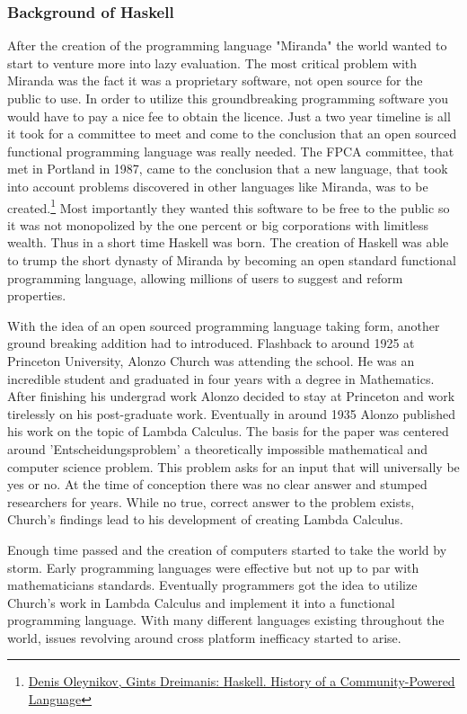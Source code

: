 \documentclass{article}
\begin{document}
        \subsubsection{Background of Haskell}
        After the creation of the programming language "Miranda" the world wanted to start to venture more into lazy evaluation. The most critical problem with Miranda was the fact it was a proprietary software, not open source for the public to use. In order to utilize this groundbreaking programming software you would have to pay a nice fee to obtain the licence. Just a two year timeline is all it took for a committee to meet and come to the conclusion that an open sourced functional programming language was really needed. The FPCA committee, that met in Portland in 1987, came to the conclusion that a new language, that took into account problems discovered in other languages like Miranda, was to be created.\footnote{\href{https://serokell.io/blog/haskell-history}{Denis Oleynikov, Gints Dreimanis: Haskell. History of a Community-Powered Language}} Most importantly they wanted this software to be free to the public so it was not monopolized by the one percent or big corporations with limitless wealth. Thus in a short time Haskell was born. The creation of Haskell was able to trump the short dynasty of Miranda by becoming an open standard functional programming language, allowing millions of users to suggest and reform properties. 
        
        \medskip With the idea of an open sourced programming language taking form, another ground breaking addition had to introduced. Flashback to around 1925 at Princeton University, Alonzo Church was attending the school. He was an incredible student and graduated in four years with a degree in Mathematics. After finishing his undergrad work Alonzo decided to stay at Princeton and work tirelessly on his post-graduate work. Eventually in around 1935 Alonzo published his work on the topic of Lambda Calculus. The basis for the paper was centered around 'Entscheidungsproblem' a theoretically impossible mathematical and computer science problem. This problem asks for an input that will universally be yes or no. At the time of conception there was no clear answer and stumped researchers for years. While no true, correct answer to the problem exists, Church's findings lead to his development of creating Lambda Calculus.
        
        \medskip Enough time passed and the creation of computers started to take the world by storm. Early programming languages were effective but not up to par with mathematicians standards. Eventually programmers got the idea to utilize Church's work in Lambda Calculus and implement it into a functional programming language. With many different languages existing throughout the world, issues revolving around cross platform inefficacy started to arise. 
        
\end{document}

